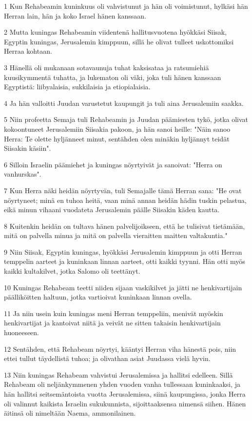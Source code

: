 \par 1 Kun Rehabeamin kuninkuus oli vahvistunut ja hän oli voimistunut, hylkäsi hän Herran lain, hän ja koko Israel hänen kanssaan.
\par 2 Mutta kuningas Rehabeamin viidentenä hallitusvuotena hyökkäsi Siisak, Egyptin kuningas, Jerusalemin kimppuun, sillä he olivat tulleet uskottomiksi Herraa kohtaan.
\par 3 Hänellä oli mukanaan sotavaunuja tuhat kaksisataa ja ratsumiehiä kuusikymmentä tuhatta, ja lukematon oli väki, joka tuli hänen kanssaan Egyptistä: liibyalaisia, sukkilaisia ja etiopialaisia.
\par 4 Ja hän valloitti Juudan varustetut kaupungit ja tuli aina Jerusalemiin saakka.
\par 5 Niin profeetta Semaja tuli Rehabeamin ja Juudan päämiesten tykö, jotka olivat kokoontuneet Jerusalemiin Siisakia pakoon, ja hän sanoi heille: "Näin sanoo Herra: Te olette hyljänneet minut, sentähden olen minäkin hyljännyt teidät Siisakin käsiin".
\par 6 Silloin Israelin päämiehet ja kuningas nöyrtyivät ja sanoivat: "Herra on vanhurskas".
\par 7 Kun Herra näki heidän nöyrtyvän, tuli Semajalle tämä Herran sana: "He ovat nöyrtyneet; minä en tuhoa heitä, vaan minä annan heidän hädin tuskin pelastua, eikä minun vihaani vuodateta Jerusalemin päälle Siisakin käden kautta.
\par 8 Kuitenkin heidän on tultava hänen palvelijoikseen, että he tulisivat tietämään, mitä on palvella minua ja mitä on palvella vieraitten maitten valtakuntia."
\par 9 Niin Siisak, Egyptin kuningas, hyökkäsi Jerusalemin kimppuun ja otti Herran temppelin aarteet ja kuninkaan linnan aarteet, otti kaikki tyynni. Hän otti myös kaikki kultakilvet, jotka Salomo oli teettänyt.
\par 10 Kuningas Rehabeam teetti niiden sijaan vaskikilvet ja jätti ne henkivartijain päälliköitten haltuun, jotka vartioivat kuninkaan linnan ovella.
\par 11 Ja niin usein kuin kuningas meni Herran temppeliin, menivät myöskin henkivartijat ja kantoivat niitä ja veivät ne sitten takaisin henkivartijain huoneeseen.
\par 12 Sentähden, että Rehabeam nöyrtyi, kääntyi Herran viha hänestä pois, niin ettei tullut täydellistä tuhoa; ja olivathan asiat Juudassa vielä hyvin.
\par 13 Niin kuningas Rehabeam vahvistui Jerusalemissa ja hallitsi edelleen. Sillä Rehabeam oli neljänkymmenen yhden vuoden vanha tullessaan kuninkaaksi, ja hän hallitsi seitsemäntoista vuotta Jerusalemissa, siinä kaupungissa, jonka Herra oli valinnut kaikista Israelin sukukunnista, sijoittaaksensa nimensä siihen. Hänen äitinsä oli nimeltään Naema, ammonilainen.
